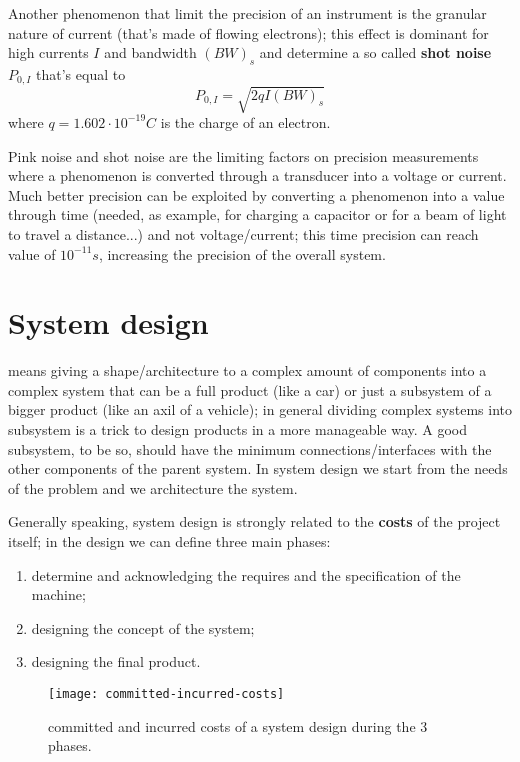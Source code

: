 		Another phenomenon that limit the precision of an instrument is the granular nature of current (that's made of flowing electrons); this effect is dominant for high currents $I$ and bandwidth $(BW)_s$ and determine a so called \textbf{shot noise} $P_{0,I}$ that's equal to		
		\[ P_{0,I} = \sqrt{2qI (BW)_s}\]
		where $q = 1.602\cdot 10^{-19} C$ is the charge of an electron.		
		\vspace{3mm}
		
		Pink noise and shot noise are the limiting factors on precision measurements where a phenomenon is converted through a transducer into a voltage or current. Much better precision can be exploited by converting a phenomenon into a value through time (needed, as example, for charging a capacitor or for a beam of light to travel a distance...) and not voltage/current; this time precision can reach value of $10^{-11} s$, increasing the precision of the overall system.
	
	
\section{System design}
	 means giving a shape/architecture to a complex amount of components into a complex system that can be a full product (like a car) or just a subsystem of a bigger product (like an axil of a vehicle); in general dividing complex systems into subsystem is a trick to design products in a more manageable way. A good subsystem, to be so, should have the minimum connections/interfaces with the other components of the parent system. In system design we start from the needs of the problem and we architecture the system.
	
	Generally speaking, system design is strongly related to the \textbf{costs} of the project itself; in the design we can define three main phases:
	\begin{enumerate}
		\item determine and acknowledging the requires and the specification of the machine;
		\item designing the concept of the system;
		\item designing the final product.
	\end{enumerate}
	
	\begin{SCfigure}[1][bht]
		\centering
		\texttt{[image: committed-incurred-costs]}
		\caption{committed and incurred costs of a system design during the 3 phases.}
		\label{fig:des:commincurr}
	\end{SCfigure}
	
